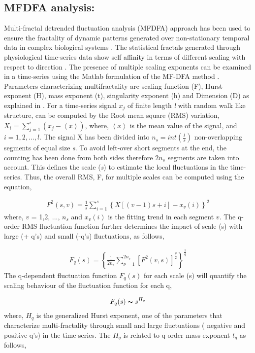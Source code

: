 \documentclass[preprintnumbers,amsmath,amssymb,onecolumn]{revtex4}
\begin{document}
\subsection{MFDFA analysis:}

Multi-fractal detrended fluctuation analysis (MFDFA) approach has been used to ensure the fractality of dynamic patterns generated over non-stationary temporal data in complex biological systems \citep{Kantelhardt2002, Eke2002}. The statistical fractals generated through physiological time-series data show self affinity in terms of different scaling with respect to direction \citep{Eke2002}. The presence of multiple scaling exponents can be examined in a time-series using the Matlab formulation of the MF-DFA method \citep{Ihlen2012}. Parameters characterizing multifractality are scaling function (F), Hurst exponent (H), mass exponent (t), singularity exponent (h) and Dimension (D) as explained in \citep{Ihlen2012}. For a time-series signal $x_{j}$ of finite length \textit{l} with random walk like structure, can be computed by the Root mean square (RMS) variation, $X_{i}=\sum_{j=1}^{i}(x_{j}-\left\langle x\right\rangle)$, where, $\left\langle x\right\rangle$ is the mean value of the signal, and $i = 1,2, ...,
l$. The signal X has been divided into $n_{s}=int(\frac{l}{s})$ non-overlapping segments of equal size \textit{s}. To avoid left-over short segments at the end, the counting has been done from both sides therefore $2n_{s}$ segments are taken into account. This defines the scale (\textit{s}) to estimate the local fluctuations in the time-series. Thus, the overall RMS, F, for multiple scales can be computed using the equation,

\begin{eqnarray}
F^{2}(s,v)=\frac{1}{s}\sum_{i=1}^{s}\left\{ X[(v-1)s+i]-x_{v}(i)\right\} ^{2}
\end{eqnarray}
where, $v$ = 1,2, ..., $n_{s}$ and $x_{v}(i)$ is the fitting trend in each segment $v$. The q-order RMS fluctuation function further determines the impact of scale (s) with large (+ q's) and small (-q's) fluctuations, as follows,

\begin{eqnarray}
F_{q}(s)=\left\{ \frac{1}{2n_{s}}\sum_{\nu=1}^{2n_s}[F^{2}(v,s)]^{\frac{q}{2}}\right\} ^{\frac{1}{q}}
\end{eqnarray}
The q-dependent fluctuation function $F_{q}(s)$ for each scale (s) will quantify the scaling behaviour of the fluctuation function for each q,

\begin{eqnarray}
F_{q}(s)\thicksim s^{H_{q}}
\end{eqnarray}
where, $H_{q}$ is the generalized Hurst exponent, one of the parameters that characterize multi-fractality through small and large fluctuations ( negative and positive q's) in the time-series. The $H_{q}$ is related
to q-order mass exponent $t_{q}$ as follows,
\end{document}
